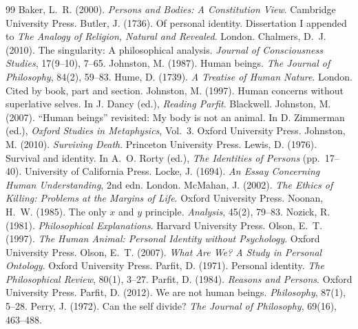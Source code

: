 \documentclass{situationist-preprint}
\begin{document}
\begin{thebibliography}{99}\small
{} Baker, L.~R. (2000). \emph{Persons and Bodies: A Constitution View}. Cambridge University Press.
 Butler, J. (1736). Of personal identity. Dissertation I appended to \emph{The Analogy of Religion, Natural and Revealed}. London.
 Chalmers, D.~J. (2010). The singularity: A philosophical analysis. \emph{Journal of Consciousness Studies}, 17(9--10), 7--65.
 Johnston, M. (1987). Human beings. \emph{The Journal of Philosophy}, 84(2), 59--83.
 Hume, D. (1739). \emph{A Treatise of Human Nature}. London. Cited by book, part and section.
 Johnston, M. (1997). Human concerns without superlative selves. In J. Dancy (ed.), \emph{Reading Parfit}. Blackwell.
 Johnston, M. (2007). \enquote{Human beings} revisited: My body is not an animal. In D. Zimmerman (ed.), \emph{Oxford Studies in Metaphysics}, Vol.~3. Oxford University Press.
 Johnston, M. (2010). \emph{Surviving Death}. Princeton University Press.
 Lewis, D. (1976). Survival and identity. In A.~O. Rorty (ed.), \emph{The Identities of Persons} (pp.~17--40). University of California Press.
 Locke, J. (1694). \emph{An Essay Concerning Human Understanding}, 2nd edn. London.
 McMahan, J. (2002). \emph{The Ethics of Killing: Problems at the Margins of Life}. Oxford University Press.
 Noonan, H.~W. (1985). The only $x$ and $y$ principle. \emph{Analysis}, 45(2), 79--83.
 Nozick, R. (1981). \emph{Philosophical Explanations}. Harvard University Press.
 Olson, E.~T. (1997). \emph{The Human Animal: Personal Identity without Psychology}. Oxford University Press.
 Olson, E.~T. (2007). \emph{What Are We? A Study in Personal Ontology}. Oxford University Press.
 Parfit, D. (1971). Personal identity. \emph{The Philosophical Review}, 80(1), 3--27.
 Parfit, D. (1984). \emph{Reasons and Persons}. Oxford University Press.
 Parfit, D. (2012). We are not human beings. \emph{Philosophy}, 87(1), 5--28.
 Perry, J. (1972). Can the self divide? \emph{The Journal of Philosophy}, 69(16), 463--488.

\end{thebibliography}
\end{document}
